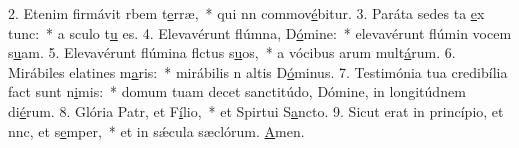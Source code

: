 2. Etenim firmávit rbem t\uline{e}rræ,~* qui nn commov\uline{é}bitur.
3. Paráta sedes ta \uline{e}x tunc:~* a sculo t\uline{u} es.
4. Elevavérunt flúmna, D\uline{ó}mine:~* elevavérunt flúmin vocem s\uline{u}am.
5. Elevavérunt flúmina flctus s\uline{u}os,~* a vócibus arum mult\uline{á}rum.
6. Mirábiles elatines m\uline{a}ris:~* mirábilis n altis D\uline{ó}minus.
7. Testimónia tua credibília fact sunt n\uline{i}mis:~* domum tuam decet sanctitúdo, Dómine, in longitúdnem di\uline{é}rum.
8. Glória Patr, et F\uline{í}lio,~* et Spirtui S\uline{a}ncto.
9. Sicut erat in princípio, et nnc, et s\uline{e}mper,~* et in sǽcula sæclórum. \uline{A}men.
